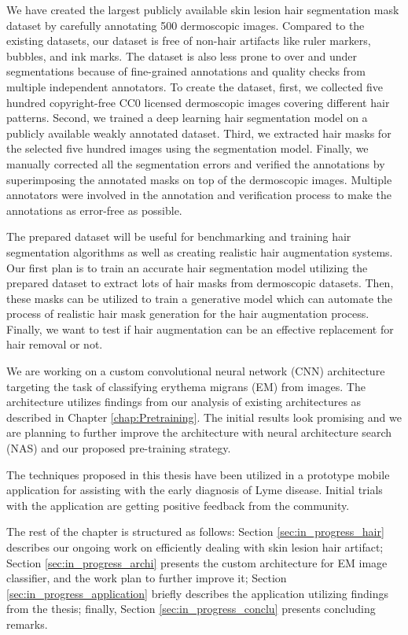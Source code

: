 We have created the largest publicly available skin lesion hair segmentation mask dataset by carefully annotating 500 dermoscopic images. Compared to the existing datasets, our dataset is free of non-hair artifacts like ruler markers, bubbles, and ink marks. The dataset is also less prone to over and under segmentations because of fine-grained annotations and quality checks from multiple independent annotators. To create the dataset, first, we collected five hundred copyright-free CC0 licensed dermoscopic images covering different hair patterns. Second, we trained a deep learning hair segmentation model on a publicly available weakly annotated dataset. Third, we extracted hair masks for the selected five hundred images using the segmentation model. Finally, we manually corrected all the segmentation errors and verified the annotations by superimposing the annotated masks on top of the dermoscopic images. Multiple annotators were involved in the annotation and verification process to make the annotations as error-free as possible. 

The prepared dataset will be useful for benchmarking and training hair segmentation algorithms as well as creating realistic hair augmentation systems. Our first plan is to train an accurate hair segmentation model utilizing the prepared dataset to extract lots of hair masks from dermoscopic datasets. Then, these masks can be utilized to train a generative model which can automate the process of realistic hair mask generation for the hair augmentation process. Finally, we want to test if hair augmentation can be an effective replacement for hair removal or not.

We are working on a custom convolutional neural network (CNN) architecture targeting the task of classifying erythema migrans (EM) from images. The architecture utilizes findings from our analysis of existing architectures as described in Chapter \ref{chap:Pretraining}. The initial results look promising and we are planning to further improve the architecture with neural architecture search (NAS) and our proposed pre-training strategy.  

The techniques proposed in this thesis have been utilized in a prototype mobile application for assisting with the early diagnosis of Lyme disease. Initial trials with the application are getting positive feedback from the community.

The rest of the chapter is structured as follows: Section \ref{sec:in_progress_hair} describes our ongoing work on efficiently dealing with skin lesion hair artifact; Section \ref{sec:in_progress_archi} presents the custom architecture for EM image classifier, and the work plan to further improve it; Section \ref{sec:in_progress_application} briefly describes the application utilizing findings from the thesis; finally, Section \ref{sec:in_progress_conclu} presents concluding remarks.
